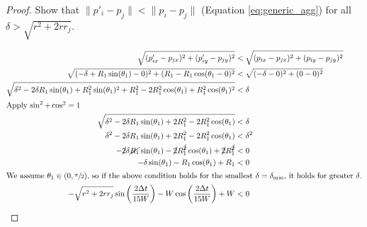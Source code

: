 \documentclass[conference]{IEEEtran}
\begin{document}
\begin{proof}
    Show that $\lVert p'_i - p_j\rVert < \lVert p_i - p_j\rVert$ (Equation \eqref{eq:generic_agg}) for all $\delta > \sqrt{r^2+2rr_j}$.

    \begin{align*}
      \sqrt{(p'_{ix} - p_{jx})^2 + (p'_{iy} - p_{jy})^2} &< \sqrt{(p_{ix} - p_{jx})^2 + (p_{iy} - p_{jy})^2} \\
      \sqrt{(-\delta+R_1\sin(\theta_1)-0)^2 + (R_1-R_1\cos(\theta_1-0)^2} &< \sqrt{(-\delta-0)^2 + (0-0)^2} \\
      \sqrt{\delta^2-2\delta R_1\sin(\theta_1) + R_1^2\sin(\theta_1)^2 + R_1^2-2R_1^2\cos(\theta_1)+R_1^2\cos(\theta_1)^2} &< \delta \\
      \intertext{Apply $\sin^2+\cos^2=1$}
      \sqrt{\delta^2-2\delta R_1\sin(\theta_1) + 2R_1^2-2R_1^2\cos(\theta_1)} &< \delta \\
      \delta^2-2\delta R_1\sin(\theta_1) + 2R_1^2-2R_1^2\cos(\theta_1) &< \delta^2 \\
      -\cancel{2}\delta \cancel{R_1}\sin(\theta_1) - \cancel{2}R_1^{\cancel{2}}\cos(\theta_1) + \cancel{2}R_1^{\cancel{2}} &< 0 \\
      -\delta \sin(\theta_1) - R_1\cos(\theta_1) + R_1 &< 0 \\
      \intertext{We assume $\theta_1\in(0,\sfrac{\pi}{2})$, so if the above condition holds for the smallest $\delta=\delta_{\text{min}}$, it holds for greater $\delta$.}
      -\sqrt{r^2+2rr_j}\sin\bigg(\frac{2\Delta t}{15W}\bigg) - W\cos\bigg(\frac{2\Delta t}{15W}\bigg) + W &< 0
    \end{align*}
  \end{proof}
\end{document}
